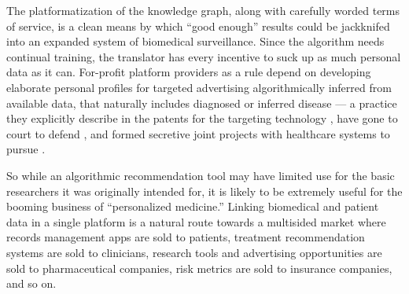 The platformatization of the knowledge graph, along with carefully
worded terms of service, is a clean means by which ``good enough''
results could be jackknifed into an expanded system of biomedical
surveillance. Since the algorithm needs continual training, the
translator has every incentive to suck up as much personal data as it
can.
For-profit platform providers as a rule depend on developing elaborate
personal profiles for targeted advertising algorithmically inferred from
available data, that naturally includes diagnosed or inferred disease --- a
practice they explicitly describe in the patents for the targeting
technology\citep{bharatGeneratingUserInformation2005} , have gone
to court to defend \citep{SmithFacebookInc2018, krashinskyGoogleBrokeCanada2014} , and formed secretive joint
projects with healthcare systems to pursue \citep{bourreauGoogleFitbitWill2020} .

So while an algorithmic recommendation tool may have limited use for the
basic researchers it was originally intended for, it is likely to be
extremely useful for the booming business of ``personalized medicine.''
Linking biomedical and patient data in a single platform is a natural
route towards a multisided market where records management apps are sold
to patients, treatment recommendation systems are sold to clinicians,
research tools and advertising opportunities are sold to pharmaceutical
companies, risk metrics are sold to insurance companies, and so on.

